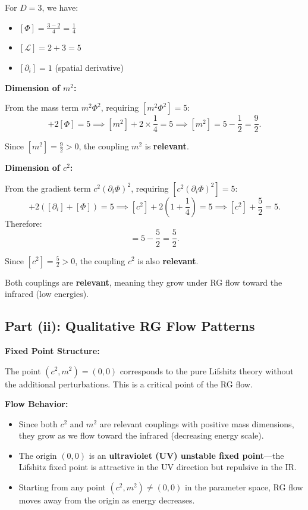 \documentclass[11pt, a4paper]{article}
\newcommand{\Lscr}{\mathcal{L}}
\newcommand{\be}{\begin{equation}}
\newcommand{\ee}{\end{equation}}
\begin{document}
For $D = 3$, we have:
\begin{itemize}
    \item $[\Phi] = \frac{3-2}{4} = \frac{1}{4}$
    \item $[\Lscr] = 2 + 3 = 5$
    \item $[\partial_i] = 1$ (spatial derivative)
\end{itemize}

\textbf{Dimension of $m^2$:}

From the mass term $m^2\Phi^2$, requiring $[m^2\Phi^2] = 5$:
\be
[m^2] + 2[\Phi] = 5 \implies [m^2] + 2 \times \frac{1}{4} = 5 \implies [m^2] = 5 - \frac{1}{2} = \frac{9}{2}.
\ee

Since $[m^2] = \frac{9}{2} > 0$, the coupling $m^2$ is \textbf{relevant}.

\textbf{Dimension of $c^2$:}

From the gradient term $c^2(\partial_i\Phi)^2$, requiring $[c^2(\partial_i\Phi)^2] = 5$:
\be
[c^2] + 2([\partial_i] + [\Phi]) = 5 \implies [c^2] + 2\left(1 + \frac{1}{4}\right) = 5 \implies [c^2] + \frac{5}{2} = 5.
\ee
Therefore:
\be
[c^2] = 5 - \frac{5}{2} = \frac{5}{2}.
\ee

Since $[c^2] = \frac{5}{2} > 0$, the coupling $c^2$ is also \textbf{relevant}.

Both couplings are \textbf{relevant}, meaning they grow under RG flow toward the infrared (low energies).

\subsection{Part (ii): Qualitative RG Flow Patterns}

\textbf{Fixed Point Structure:}

The point $(c^2, m^2) = (0, 0)$ corresponds to the pure Lifshitz theory without the additional perturbations. This is a critical point of the RG flow.

\textbf{Flow Behavior:}
\begin{itemize}
    \item Since both $c^2$ and $m^2$ are relevant couplings with positive mass dimensions, they grow as we flow toward the infrared (decreasing energy scale).
    \item The origin $(0,0)$ is an \textbf{ultraviolet (UV) unstable fixed point}—the Lifshitz fixed point is attractive in the UV direction but repulsive in the IR.
    \item Starting from any point $(c^2, m^2) \neq (0,0)$ in the parameter space, RG flow moves away from the origin as energy decreases.
\end{itemize}
\end{document}
